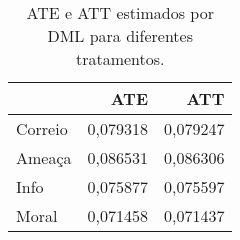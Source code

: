 \begin{table}
\centering
\caption{ATE e ATT estimados por DML para diferentes tratamentos.}
\label{tab:dml-effects}
\begin{tabular}{lrr}
\toprule
{} &       ATE &       ATT \\
\midrule
Correio &  0,079318 &  0,079247 \\
Ameaça  &  0,086531 &  0,086306 \\
Info    &  0,075877 &  0,075597 \\
Moral   &  0,071458 &  0,071437 \\
\bottomrule
\end{tabular}
\end{table}
